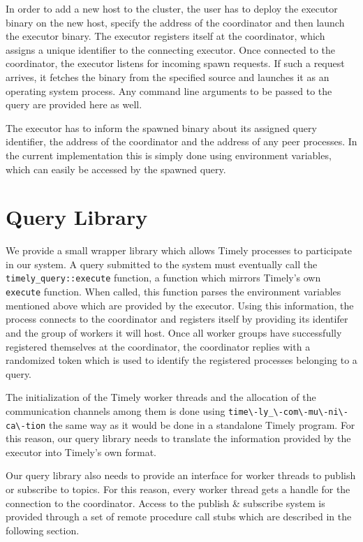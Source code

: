 In order to add a new host to the cluster, the user has to deploy the executor
binary on the new host, specify the address of the coordinator and then launch
the executor binary. The executor registers itself at the coordinator, which
assigns a unique identifier to the connecting executor. Once connected to the
coordinator, the executor listens for incoming spawn requests. If such a
request arrives, it fetches the binary from the specified source and launches
it as an operating system process. Any command line arguments to be passed
to the query are provided here as well.

The executor has to inform the spawned binary about its assigned query identifier,
the address of the coordinator and the address of any peer processes. In the
current implementation this is simply done using environment variables, which
can easily be accessed by the spawned query.


\section{Query Library}

We provide a small wrapper library which allows Timely processes to participate
in our system. A query submitted to the system must eventually call the 
\lstinline{timely_query::execute} function, a function which mirrors Timely's
own \lstinline{execute} function. When called, this function parses the
environment variables mentioned above which are provided by the executor.
Using this information, the process connects to the coordinator and registers
itself by providing its identifer and the group of workers it will host. Once
all worker groups have successfully registered themselves at the coordinator,
the coordinator replies with a randomized token which is used to identify
the registered processes belonging to a query. 

The initialization of the Timely worker threads and the allocation of the
communication channels among them is done using \lstinline{time\-ly_\-com\-mu\-ni\-ca\-tion}
the same way as it would be done in a standalone Timely program. For this
reason, our query library needs to translate the information provided by the
executor into Timely's own format.

Our query library also needs to provide an interface for worker threads to
publish or subscribe to topics. For this reason, every worker thread gets
a handle for the connection to the coordinator. Access to the
publish \& subscribe system is provided through a set of remote
procedure call stubs which are described in the following section.

